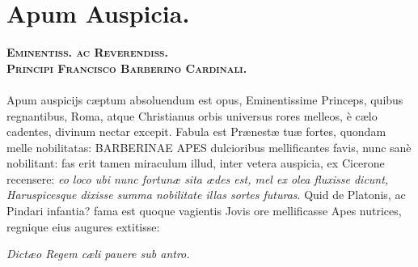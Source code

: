 \documentclass[a4paper, 11pt, oneside, polutonikogreek, latin]{article}
\begin{document}
\section{Apum Auspicia.}
\begin{center}
\scshape\textbf{Eminentiss. ac Reverendiss.\\Principi Francisco Barberino Cardinali.}
\end{center}
\paragraph{}
Apum auspicijs cæptum absoluendum est opus, Eminentissime Princeps, quibus regnantibus, Roma, atque Christianus orbis universus rores melleos, è cælo cadentes, divinum nectar excepit. Fabula est Prænestæ tuæ fortes, quondam melle nobilitatas: BARBERINAE APES dulcioribus mellificantes favis, nunc sanè nobilitant: fas erit tamen miraculum illud, inter vetera auspicia, ex Cicerone recensere: \emph{eo loco ubi nunc fortunæ sita ædes est, mel ex olea fluxisse dicunt, Haruspicesque dixisse summa nobilitate illas sortes futuras}. Quid de Platonis, ac Pindari infantia? fama est quoque vagientis Jovis ore mellificasse Apes nutrices, regnique eius augures extitisse:

\emph{Dictæo Regem cæli pauere sub antro.}
\end{document}
